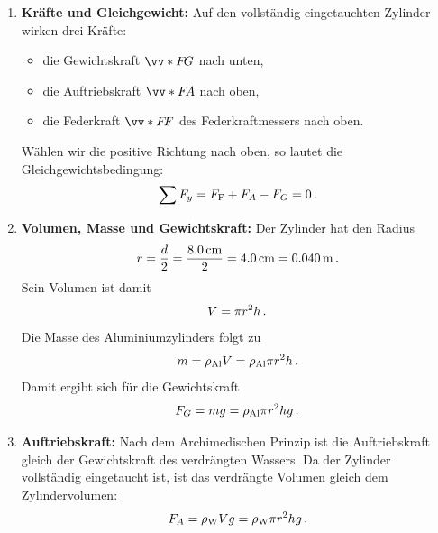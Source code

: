 \documentclass[ngerman]{scrreprt}
\newenvironment{loesungbox}[1]
  {\needspace{5\baselineskip}\begin{loesungboxstyle}[frametitle={#1}]}
  {\end{loesungboxstyle}}
\begin{document}
\begin{loesungbox}{Lösung zu \Cref{aufg:zylinder_unter_wasser}}
\begin{enumerate}
    \item \textbf{Kräfte und Gleichgewicht:}
    Auf den vollständig eingetauchten Zylinder wirken drei Kräfte:
    \begin{itemize}
        \item die Gewichtskraft $\ivecS{F}{G}$ nach unten,
        \item die Auftriebskraft $\ivecS{F}{A}$ nach oben,
        \item die Federkraft $\ivecS{F}{F}$ des Federkraftmessers nach oben.
    \end{itemize}
    Wählen wir die positive Richtung nach oben, so lautet die Gleichgewichtsbedingung:
    \begin{equation}\label{eq: zylinder_unter_wasser_gleichgewicht}
        \sum F_y = F_{\text{F}} + F_A - F_G = 0 \,.
    \end{equation}

    \item \textbf{Volumen, Masse und Gewichtskraft:}
    Der Zylinder hat den Radius
    \begin{equation}
        r = \frac{d}{2} = \frac{\SI{8.0}{\centi\metre}}{2} = \SI{4.0}{\centi\metre} = \SI{0.040}{\metre} \,.
    \end{equation}
    Sein Volumen ist damit
    \begin{equation}\label{eq: zylinder_unter_wasser_volumen}
        V = \pi r^2 h \,.
    \end{equation}
    Die Masse des Aluminiumzylinders folgt zu
    \begin{equation}\label{eq: zylinder_unter_wasser_masse}
        m = \rho_{\text{Al}} V = \rho_{\text{Al}} \pi r^2 h \,.
    \end{equation}
    Damit ergibt sich für die Gewichtskraft
    \begin{equation}\label{eq: zylinder_unter_wasser_gewichtskraft}
        F_G = m g = \rho_{\text{Al}} \pi r^2 h g \,.
    \end{equation}

    \item \textbf{Auftriebskraft:}
    Nach dem Archimedischen Prinzip ist die Auftriebskraft gleich der Gewichtskraft des verdrängten Wassers. Da der Zylinder vollständig eingetaucht ist, ist das verdrängte Volumen gleich dem Zylindervolumen:
    \begin{equation}\label{eq: zylinder_unter_wasser_auftrieb}
        F_A = \rho_{\text{W}} V g = \rho_{\text{W}} \pi r^2 h g \,.
    \end{equation}


\end{enumerate}
\end{loesungbox}
\end{document}
